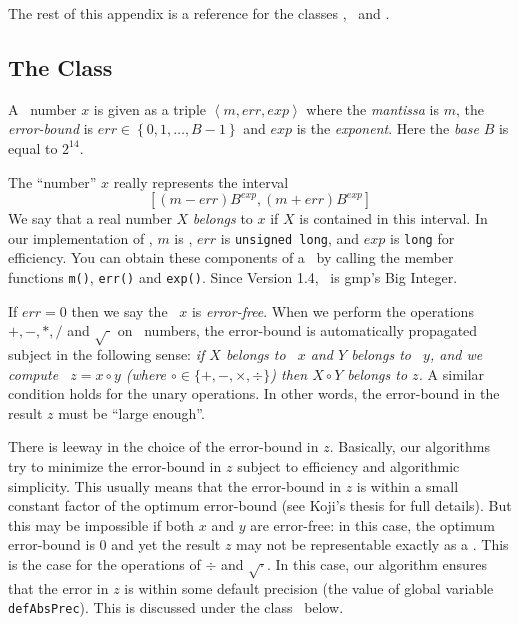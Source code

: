 The rest of this appendix is a reference for the classes
\BF, \real\ and \expr.


\subsection{The Class \BF}
A \BF\ number $x$ is given as a triple $\left< m, err, exp \right> $ 
where the {\em mantissa} is $m$, the {\em error-bound} is
$err \in \left\{ 0, 1, \ldots, B-1 \right\}$ and 
$exp$ is the {\em exponent}. Here the {\em base} $B$ is equal to $2^{14}$.

The ``number'' $x$ really represents the interval
	\begin{equation}
	\label{eq:bigfloat}
	\left[ \left( m - err \right) B^{exp}, \left( m + err \right) B^{exp} \right]
	\end{equation}
We say that a real number $X$ {\em belongs} to $x$ if
$X$ is contained in this interval.
In our implementation of \BF, $m$ is \Int, $err$ is
{\tt unsigned long}, and $exp$ is {\tt long} for efficiency. 
You can obtain these components of a \BF\ by calling
the member functions \texttt{m()}, \texttt{err()} and \texttt{exp()}.
Since Version 1.4, \Int\ is gmp's Big Integer.

If $err = 0$ then we say the \BF\ $x$ is {\em error-free}. When we
perform the operations $ +, -, *, / $ and $ \sqrt{\phantom{\cdot}} $
on \BF\ numbers, the error-bound is automatically propagated subject in the
following sense:
{\em
if $X$ belongs to \BF\ $x$ and $Y$ belongs
to \BF\ $y$, and we compute \BF\ $z=x\circ y$ (where $\circ\in\{+,-,\times,\div\}$)
then $X\circ Y$ belongs to $z$.
}  A similar condition holds for the unary operations.
In other words, the error-bound in the result $z$ must be ``large enough''.

There is leeway in the choice of the error-bound in $z$.
Basically, our algorithms try to minimize the error-bound in $z$ subject to
efficiency and algorithmic simplicity.
This usually means that the error-bound in $z$ is within a small
constant factor of the optimum error-bound
(see Koji's thesis \cite{ouchi:thesis} for full details).
But this may be impossible
if both $x$ and $y$ are error-free: in this case, the optimum error-bound
is $0$ and yet the result $z$ may not be representable
exactly as a \BF.  This is the case for
the operations of $\div$ and $\sqrt{\cdot}$.
In this case, our algorithm ensures that
the error in $z$ is within some default precision (the value of
global variable {\tt defAbsPrec}).
This is discussed under the class \real\ below.  

